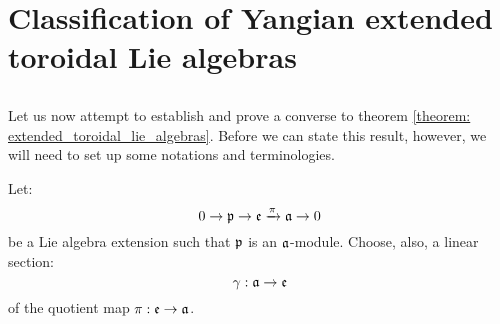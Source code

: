 \section{Classification of Yangian extended toroidal Lie algebras}
    \subsection{}
        Let us now attempt to establish and prove a converse to theorem \ref{theorem: extended_toroidal_lie_algebras}. Before we can state this result, however, we will need to set up some notations and terminologies.
        \begin{convention}
            Let:
                $$0 \to \mathfrak{p} \to \mathfrak{e} \xrightarrow[]{\pi} \mathfrak{a} \to 0$$
            be a Lie algebra extension such that $\mathfrak{p}$ is an $\mathfrak{a}$-module. Choose, also, a linear section:
                $$\gamma: \mathfrak{a} \to \mathfrak{e}$$
            of the quotient map $\pi: \mathfrak{e} \to \mathfrak{a}$. 
        \end{convention}

    \subsection{}
        \begin{theorem} \label{theorem: yangian_extended_toroidal_lie_algebras_criterion}
            
        \end{theorem}